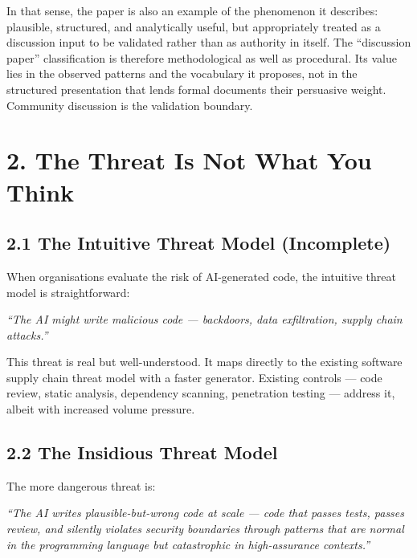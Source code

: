 \documentclass[a4paper,11pt]{report}
\renewenvironment{quote}{%
  \par\medskip\noindent
  \hspace{0.5cm}\begin{minipage}{\dimexpr\textwidth-1cm}
  \itshape\color{dtabody}
}{%
  \end{minipage}\par\medskip
}
\begin{document}
In that sense, the paper is also an example of the phenomenon it
describes: plausible, structured, and analytically useful, but
appropriately treated as a discussion input to be validated rather than
as authority in itself. The ``discussion paper'' classification is
therefore methodological as well as procedural. Its value lies in the
observed patterns and the vocabulary it proposes, not in the structured
presentation that lends formal documents their persuasive weight.
Community discussion is the validation boundary.

\hypertarget{the-threat-is-not-what-you-think}{%
\section{2. The Threat Is Not What You
Think}\label{the-threat-is-not-what-you-think}}

\hypertarget{the-intuitive-threat-model-incomplete}{%
\subsection{2.1 The Intuitive Threat Model
(Incomplete)}\label{the-intuitive-threat-model-incomplete}}

When organisations evaluate the risk of AI-generated code, the intuitive
threat model is straightforward:

\begin{quote}
\emph{``The AI might write malicious code --- backdoors, data
exfiltration, supply chain attacks.''}
\end{quote}

This threat is real but well-understood. It maps directly to the
existing software supply chain threat model with a faster generator.
Existing controls --- code review, static analysis, dependency scanning,
penetration testing --- address it, albeit with increased volume
pressure.

\hypertarget{the-insidious-threat-model}{%
\subsection{2.2 The Insidious Threat
Model}\label{the-insidious-threat-model}}

The more dangerous threat is:

\begin{quote}
\emph{``The AI writes plausible-but-wrong code at scale --- code that
passes tests, passes review, and silently violates security boundaries
through patterns that are normal in the programming language but
catastrophic in high-assurance contexts.''}
\end{quote}
\end{document}
